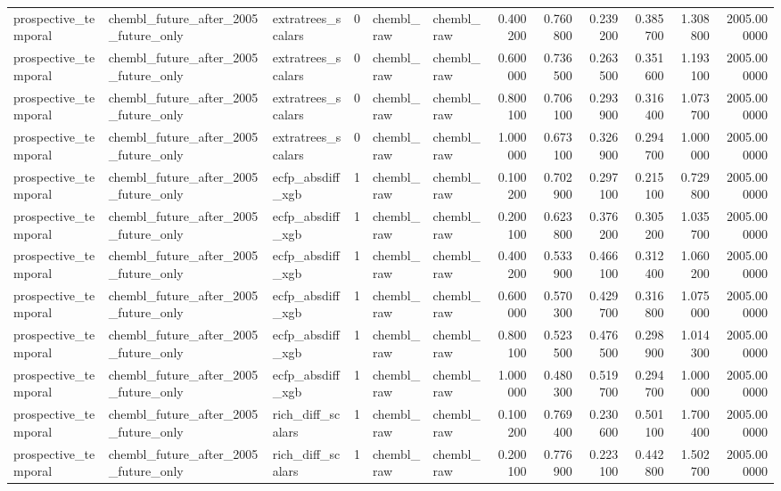 \begin{longtable}{lllrllrrrrrr}
prospective\_temporal & chembl\_future\_after\_2005\_future\_only & extratrees\_scalars & 0 & chembl\_raw & chembl\_raw & 0.400200 & 0.760800 & 0.239200 & 0.385700 & 1.308800 & 2005.000000 \\
prospective\_temporal & chembl\_future\_after\_2005\_future\_only & extratrees\_scalars & 0 & chembl\_raw & chembl\_raw & 0.600000 & 0.736500 & 0.263500 & 0.351600 & 1.193100 & 2005.000000 \\
prospective\_temporal & chembl\_future\_after\_2005\_future\_only & extratrees\_scalars & 0 & chembl\_raw & chembl\_raw & 0.800100 & 0.706100 & 0.293900 & 0.316400 & 1.073700 & 2005.000000 \\
prospective\_temporal & chembl\_future\_after\_2005\_future\_only & extratrees\_scalars & 0 & chembl\_raw & chembl\_raw & 1.000000 & 0.673100 & 0.326900 & 0.294700 & 1.000000 & 2005.000000 \\
prospective\_temporal & chembl\_future\_after\_2005\_future\_only & ecfp\_absdiff\_xgb & 1 & chembl\_raw & chembl\_raw & 0.100200 & 0.702900 & 0.297100 & 0.215100 & 0.729800 & 2005.000000 \\
prospective\_temporal & chembl\_future\_after\_2005\_future\_only & ecfp\_absdiff\_xgb & 1 & chembl\_raw & chembl\_raw & 0.200100 & 0.623800 & 0.376200 & 0.305200 & 1.035700 & 2005.000000 \\
prospective\_temporal & chembl\_future\_after\_2005\_future\_only & ecfp\_absdiff\_xgb & 1 & chembl\_raw & chembl\_raw & 0.400200 & 0.533900 & 0.466100 & 0.312400 & 1.060200 & 2005.000000 \\
prospective\_temporal & chembl\_future\_after\_2005\_future\_only & ecfp\_absdiff\_xgb & 1 & chembl\_raw & chembl\_raw & 0.600000 & 0.570300 & 0.429700 & 0.316800 & 1.075000 & 2005.000000 \\
prospective\_temporal & chembl\_future\_after\_2005\_future\_only & ecfp\_absdiff\_xgb & 1 & chembl\_raw & chembl\_raw & 0.800100 & 0.523500 & 0.476500 & 0.298900 & 1.014300 & 2005.000000 \\
prospective\_temporal & chembl\_future\_after\_2005\_future\_only & ecfp\_absdiff\_xgb & 1 & chembl\_raw & chembl\_raw & 1.000000 & 0.480300 & 0.519700 & 0.294700 & 1.000000 & 2005.000000 \\
prospective\_temporal & chembl\_future\_after\_2005\_future\_only & rich\_diff\_scalars & 1 & chembl\_raw & chembl\_raw & 0.100200 & 0.769400 & 0.230600 & 0.501100 & 1.700400 & 2005.000000 \\
prospective\_temporal & chembl\_future\_after\_2005\_future\_only & rich\_diff\_scalars & 1 & chembl\_raw & chembl\_raw & 0.200100 & 0.776900 & 0.223100 & 0.442800 & 1.502700 & 2005.000000 \\

\end{longtable}
